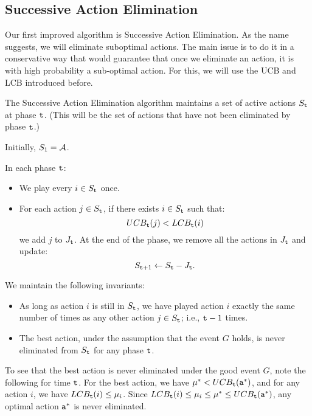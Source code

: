 \subsection{Successive Action Elimination}


Our first improved algorithm is Successive Action Elimination. As the name suggests, we will eliminate suboptimal actions. The main issue is to do it in a conservative way that would guarantee that once we eliminate an action, it is with high probability a sub-optimal action. For this, we will use the UCB and LCB introduced before.

The Successive Action Elimination algorithm maintains a set of active actions $S_{\tt t}$ at phase ${\tt t}$. (This will be the set of actions that have not been eliminated by phase ${\tt t}$.)

Initially, $S_1=\mathcal{A}$.

In each phase ${\tt t}$:
\begin{itemize}
\item We play every $i\in S_{\tt t}$ once.
\item For each action $j\in S_{\tt t}$, if there exists $i\in S_{\tt t}$ such that:
\[
UCB_{{\tt t}}(j)<LCB_{{\tt t}}(i)
\]
we add $j$ to $J_{\tt t}$.
At the end of the phase, we remove all the actions in $J_{\tt t}$ and update:
\[
S_{{\tt t}+1}\leftarrow S_{\tt t}-J_{\tt t}.
\]
\end{itemize}


We maintain the following invariants:
\begin{itemize}
\item As long as action $i$ is still in $S_{\tt t}$, we have played action $i$ exactly the
same number of times as any other action $j\in S_{\tt t}$; i.e., ${\tt t}-1$ times.
\item The best action, under the assumption that the event $G$ holds, is never eliminated
from $S_{\tt t}$ for any phase ${\tt t}$.
\end{itemize}
To see that the best action is never eliminated under the good event $G$, note the following for time ${\tt t}$. For the best action, we have $\mu^*< UCB_{{\tt t}}({\tt a}^*)$, and for any action $i$, we have $LCB_{\tt t}(i)\leq \mu_i$. Since $LCB_{\tt t}(i)\leq \mu_i\leq \mu^*\leq UCB_{\tt t}({\tt a}^*)$, any optimal action ${\tt a}^*$ is never eliminated.

